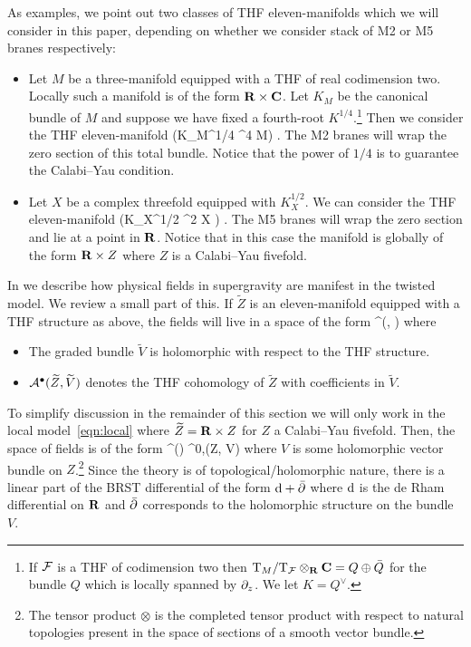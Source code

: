 \documentclass[../main.tex]{subfiles}
\newcommand\til{\widetilde}
\begin{document}
As examples, we point out two classes of THF eleven-manifolds which we will consider in this paper, depending on whether we consider stack of M2 or M5 branes respectively:
\begin{itemize}
\item Let $M$ be a three-manifold equipped with a THF of real codimension two. 
Locally such a manifold is of the form $\mathbf{R} \times \mathbf{C}$.
Let $K_M$ be the canonical bundle of $M$ and suppose we have fixed a fourth-root $K^{1/4}$.\footnote{If $\mathcal F$ is a THF of codimension two then ${\mathrm{T}}_M / {\mathrm{T}}_\mathcal F \otimes_{\mathbf{R}} \mathbf{C} = Q \oplus \bar{Q}$ for the bundle $Q$ which is locally spanned by $\partial_z$.
We let $K = Q^\vee$.}
Then we consider the THF eleven-manifold 
\beqn\label{eqn:thfm2}
 \left(K_M^{1/4} \otimes \C^4 \to M\right) .
\eeqn
The M2 branes will wrap the zero section of this total bundle.
Notice that the power of $1/4$ is to guarantee the Calabi--Yau condition.
\item Let $X$ be a complex threefold equipped with $K_X^{1/2}$.
We can consider the THF eleven-manifold
\beqn\label{eqn:thfm5}
\R \times {} \left(K_X^{1/2} \otimes \C^2 \to X \right) .
\eeqn
The M5 branes will wrap the zero section and lie at a point in $\mathbf{R}$.
Notice that in this case the manifold is globally of the form $\mathbf{R} \times Z$ where $Z$ is a Calabi--Yau fivefold.
\end{itemize}


In \cite{RSW,RWindex} we describe how physical fields in supergravity are manifest in the twisted model.
We review a small part of this.
If $\til{Z}$ is an eleven-manifold equipped with a THF structure as above, the fields will live in a space of the form
\beqn
\cA^\bu(\til{Z}, \til{V})
\eeqn
where
\begin{itemize}
\item The graded bundle $\til{V}$ is holomorphic with respect to the THF structure.
\item $\cA^\bu (\til{Z}, \til{V})$ denotes the THF cohomology of $\til{Z}$ with coefficients in $\til{V}$.
\end{itemize}
To simplify discussion in the remainder of this section we will only work in the local model~\eqref{eqn:local} where $\til{Z} = \R \times Z$ for $Z$ a Calabi--Yau fivefold.
Then, the space of fields is of the form
\beqn
\Omega^\bu(\R) \otimes \Omega^{0,\bu}(Z, V)
\eeqn
where $V$ is some holomorphic vector bundle on $Z$.\footnote{The tensor product $\otimes$ is the completed tensor product with respect to natural topologies present in the space of sections of a smooth vector bundle.}
Since the theory is of topological/holomorphic nature, there is a linear part of the BRST differential of the form $\mathrm{d} + \bar{\partial}$ where $\mathrm{d}$ is the de Rham differential on $\mathbf{R}$ and $\bar{\partial}$ corresponds to the holomorphic structure on the bundle $V$.
\end{document}
